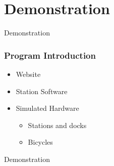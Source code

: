 \section{Demonstration}
\begin{frame}
	\begin{center}
		\Huge Demonstration
	\end{center}
\end{frame}

\begin{frame}
\frametitle{Program Introduction}
\begin{itemize}
\item Website
\item Station Software
\item Simulated Hardware
\begin{itemize}
\item Stations and docks
\item Bicycles
\end{itemize}
\end{itemize}
\end{frame}

\begin{frame}
	\begin{center}
		\Huge Demonstration
	\end{center}
\end{frame}